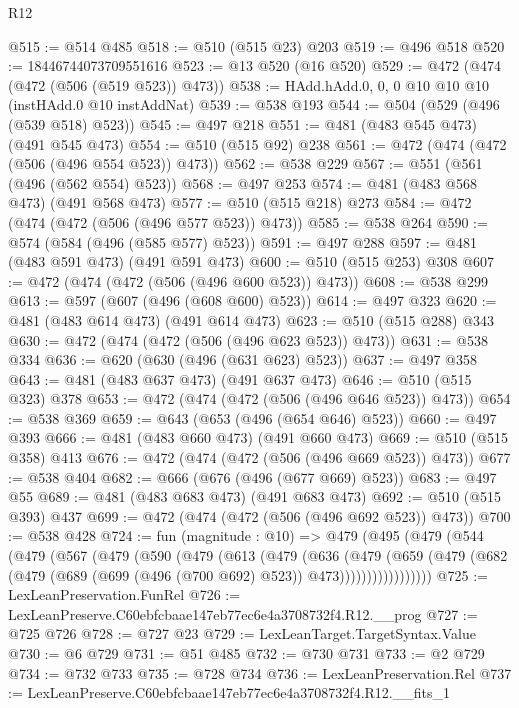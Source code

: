 \begin{lexlean}{R12}
\begin{coremodule}
@515 := @514 @485
@518 := @510 (@515 @23) @203
@519 := @496 @518
@520 := 18446744073709551616
@523 := @13 @520 (@16 @520)
@529 := @472 (@474 (@472 (@506 (@519 @523)) @473))
@538 := HAdd.hAdd.{0, 0, 0} @10 @10 @10 (instHAdd.{0} @10 instAddNat)
@539 := @538 @193
@544 := @504 (@529 (@496 (@539 @518) @523))
@545 := @497 @218
@551 := @481 (@483 @545 @473) (@491 @545 @473)
@554 := @510 (@515 @92) @238
@561 := @472 (@474 (@472 (@506 (@496 @554 @523)) @473))
@562 := @538 @229
@567 := @551 (@561 (@496 (@562 @554) @523))
@568 := @497 @253
@574 := @481 (@483 @568 @473) (@491 @568 @473)
@577 := @510 (@515 @218) @273
@584 := @472 (@474 (@472 (@506 (@496 @577 @523)) @473))
@585 := @538 @264
@590 := @574 (@584 (@496 (@585 @577) @523))
@591 := @497 @288
@597 := @481 (@483 @591 @473) (@491 @591 @473)
@600 := @510 (@515 @253) @308
@607 := @472 (@474 (@472 (@506 (@496 @600 @523)) @473))
@608 := @538 @299
@613 := @597 (@607 (@496 (@608 @600) @523))
@614 := @497 @323
@620 := @481 (@483 @614 @473) (@491 @614 @473)
@623 := @510 (@515 @288) @343
@630 := @472 (@474 (@472 (@506 (@496 @623 @523)) @473))
@631 := @538 @334
@636 := @620 (@630 (@496 (@631 @623) @523))
@637 := @497 @358
@643 := @481 (@483 @637 @473) (@491 @637 @473)
@646 := @510 (@515 @323) @378
@653 := @472 (@474 (@472 (@506 (@496 @646 @523)) @473))
@654 := @538 @369
@659 := @643 (@653 (@496 (@654 @646) @523))
@660 := @497 @393
@666 := @481 (@483 @660 @473) (@491 @660 @473)
@669 := @510 (@515 @358) @413
@676 := @472 (@474 (@472 (@506 (@496 @669 @523)) @473))
@677 := @538 @404
@682 := @666 (@676 (@496 (@677 @669) @523))
@683 := @497 @55
@689 := @481 (@483 @683 @473) (@491 @683 @473)
@692 := @510 (@515 @393) @437
@699 := @472 (@474 (@472 (@506 (@496 @692 @523)) @473))
@700 := @538 @428
@724 := fun (magnitude : @10) =>
  @479
    (@495
      (@479
        (@544
          (@479
            (@567
              (@479
                (@590
                  (@479
                    (@613
                      (@479
                        (@636
                          (@479
                            (@659
                              (@479
                                (@682
                                  (@479 (@689 (@699 (@496 (@700 @692) @523)) @473)))))))))))))))))
@725 := LexLeanPreservation.FunRel
@726 := LexLeanPreserve.C60ebfcbaae147eb77ec6e4a3708732f4.R12.__prog
@727 := @725 @726
@728 := @727 @23
@729 := LexLeanTarget.TargetSyntax.Value
@730 := @6 @729
@731 := @51 @485
@732 := @730 @731
@733 := @2 @729
@734 := @732 @733
@735 := @728 @734
@736 := LexLeanPreservation.Rel
@737 := LexLeanPreserve.C60ebfcbaae147eb77ec6e4a3708732f4.R12.__fits_1

\end{coremodule}
\end{lexlean}
